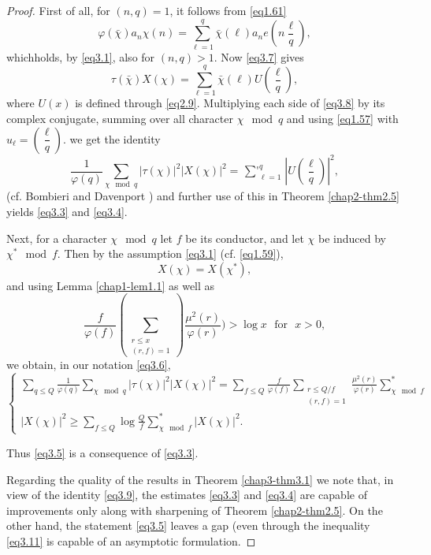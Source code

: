 \begin{proof}%
First of all, for $(n,q)=1$, it follows from \eqref{eq1.61}
\begin{equation*}
\varphi(\bar{\chi})a_n \chi(n) = \sum_{\ell=1}^{q} \bar{\chi}(\ell)a_n
e(n\frac{\ell}{q}),\tag{3.7}\label{eq3.7} 
\end{equation*}
which\pageoriginale holds, by \eqref{eq3.1}, also for $(n,q)>1$. Now
\eqref{eq3.7} gives 
\begin{equation*}
\tau (\bar{\chi}) X (\chi) =
\sum^{q}_{\ell=1}\bar{\chi}(\ell)U(\frac{\ell}{q}), \tag{3.8}\label{eq3.8}
\end{equation*}
where $U(x)$ is defined through \eqref{eq2.9}. Multiplying each side of
\eqref{eq3.8} by its complex conjugate, summing over all character $\chi \mod
q$ and using \eqref{eq1.57} with $u_\ell=(\dfrac{\ell}{q})$. we get
the identity   
\begin{equation*}
\frac{1}{\varphi (q)} \sum_{\chi \mod q}|\tau (\chi)|^2|X(\chi)|^2=
\mathop{\sum{}'}_{\ell 
  =1}^{q} |U(\frac{\ell}{q})|^2, \tag{3.9}\label{eq3.9}  
\end{equation*}
(cf. Bombieri and Davenport \cite{key2}) and further use of this in
Theorem \ref{chap2-thm2.5} yields \eqref{eq3.3} and \eqref{eq3.4}.

Next, for a character $\chi \mod q$ let $f$ be its conductor, and let $\chi$
be induced by $\chi^* \mod f$. Then by the assumption \eqref{eq3.1}
(cf. \eqref{eq1.59}),   
\begin{equation*}
X(\chi) = X(\chi^*), \tag{3.10}\label{eq3.10}
\end{equation*}
and using Lemma \ref{chap1-lem1.1} as well as
\begin{equation*}
\frac{f}{\varphi (f)}(\sum_{\substack{ r \leq x \\ (r,f)=1}})
\frac{\mu^2 (r)}{\varphi (r)}) > \log x \text{~ for~ } x > 0,
\tag{3.11}\label{eq3.11} 
\end{equation*}
we obtain, in our notation \eqref{eq3.6},
\begin{equation*}
\begin{cases}
\sum_{q \leq Q} \frac{1}{\varphi (q)} \sum_{\chi \mod q} |\tau
(\chi)|^2 |X(\chi)|^2= \sum_{f \leq Q} \frac{f}{\varphi (f)}
\sum_{\substack{r \leq Q/f \\ (r,f)=1}} \frac{\mu^2 (r)}{\varphi (r)}
\sum^*_{\chi \mod f}\\
 |X(\chi)|^2 \geq \sum_{f \leq Q} \log \frac{Q}{f}
\sum^*_{\chi \mod f}|X(\chi)|^2.  
\end{cases}\tag{3.12}\label{eq3.12}
\end{equation*}

Thus \eqref{eq3.5} is a consequence of \eqref{eq3.3}.

Regarding the quality of the results in Theorem \ref{chap3-thm3.1} we
note that, in 
view of the identity \eqref{eq3.9}, the estimates \eqref{eq3.3} and
\eqref{eq3.4} are 
capable of improvements only along with sharpening of Theorem
\ref{chap2-thm2.5}. On the other hand, the statement \eqref{eq3.5}
leaves a gap (even
through the inequality \eqref{eq3.11} is capable of an asymptotic
formulation.  
\end{proof}


